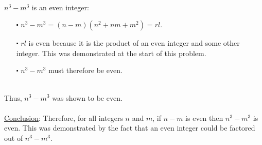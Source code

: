 \documentclass[12pt]{article}
\begin{document}
\newblock
\\
$n^3-m^3$ is an even integer:
\begin{itemize}
  \item [$\centerdot$] $n^3-m^3 = (n-m)(n^2+nm+m^2) = rl$.
  \item [$\centerdot$] $rl$ is even because it is the product of an even integer and some other integer. This was demonstrated at the start of this problem.
  \item [$\centerdot$] $n^3-m^3$ must therefore be even.
\end{itemize}
\newblock
\\
Thus, $n^3-m^3$ was shown to be even.
\\ \\
\underline{Conclusion}:
Therefore, for all integers $n$ and $m$, if $n - m$ is even then $n^3 - m^3$ is even.
This was demonstrated by the fact that an even integer could be factored out of $n^3 - m^3$. 
\end{document}
